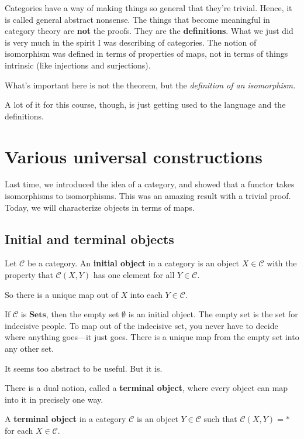 Categories have a way of making things so general that they're trivial. Hence,
it is called general abstract nonsense. The things that become meaningful in
category theory are \textbf{not} the proofs. They are the \textbf{definitions}.
What we just did is very much in the spirit I was describing of categories. The
notion of isomorphism was defined in terms of properties of maps, not in terms
of things intrinsic (like injections and surjections). 

What's important here is not the theorem, but the \emph{definition of an
isomorphism.}



A lot of it for this course, though, is just getting used to the language and
the definitions.  

\section{Various universal constructions}

Last time, we introduced the idea of a category, and showed that a functor
takes isomorphisms to isomorphisms.  This was an amazing result with a trivial
proof.  Today, we will characterize objects in terms of maps.
\subsection{Initial and terminal objects}


\begin{definition} 
Let $\mathcal{C}$ be a category. An \textbf{initial object} in a category is an
object $X \in \mathcal{C}$ with the property that $\mathcal{C}(X, Y)$ has one
element for all $Y \in \mathcal{C}$. 

So there is a unique map out of $X$ into each $Y \in \mathcal{C}$. 
\end{definition} 


\begin{example} 
If $\mathcal{C}$ is $\mathbf{Sets}$, then the empty set $\emptyset$ is an
initial object. The empty set is the set for indecisive people. To map out of
the indecisive set, you never have to decide where anything goes---it just
goes. There is a unique map from the empty set into any other set. 
\end{example} 

It seems too abstract to be useful. But it is. 

There is a dual notion, called a \textbf{terminal object}, where every object
can map into it in precisely one way. 
\begin{definition} 
A \textbf{terminal object} in a category $\mathcal{C}$ is an object $Y \in
\mathcal{C}$ such that $\mathcal{C}(X, Y) = \ast$ for each $X \in \mathcal{C}$.
\end{definition} 

